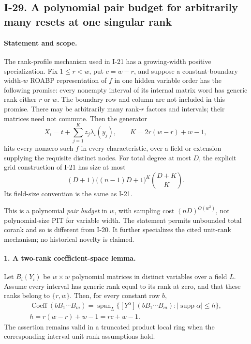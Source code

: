 \subsection{I-29. A polynomial pair budget for arbitrarily many resets at one singular rank}
\label{I-29}

\paragraph{Statement and scope.}
The rank-profile mechanism used in I-21 has a growing-width
positive specialization.  Fix $1\le r<w$, put $c=w-r$, and
suppose a constant-boundary width-$w$ ROABP representation
of $f$ in one hidden variable order has the following promise:
every nonempty interval of its internal matrix word has generic
rank either $r$ or $w$.  The boundary row and column are not
included in this promise.  There may be arbitrarily many
rank-$r$ factors and intervals; their matrices need not commute.
Then the generator
\[
 X_i=t+\sum_{j=1}^{K}z_j\lambda_i(y_j),
 \qquad K=2r(w-r)+w-1,
 \tag{I.42}
\]
hits every nonzero such $f$ in every characteristic, over a
field or extension supplying the requisite distinct nodes.
For total degree at most $D$, the explicit grid construction
of I-21 has size at most
\[
 (D+1)\bigl((n-1)D+1\bigr)^K\binom{D+K}{K}.
 \tag{I.43}
\]
Its field-size convention is the same as I-21.

This is a polynomial \emph{pair budget} in $w$, with
sampling cost $(nD)^{O(w^2)}$, not polynomial-size PIT for
variable width.  The statement permits unbounded total
corank and so is different from I-20.  It further specializes
the cited unit-rank mechanism; no historical novelty is claimed.

\paragraph{1. A two-rank coefficient-space lemma.}
Let $B_i(Y_i)$ be $w\times w$ polynomial matrices in distinct
variables over a field $L$.  Assume every interval has generic
rank equal to its rank at zero, and that these ranks belong
to $\{r,w\}$.  Then, for every constant row $b$,
\[
 \begin{gathered}
 \operatorname{Coeff}(bB_1\cdots B_m)
 =\operatorname{span}_L\{
       [Y^\alpha](bB_1\cdots B_m):
       |\operatorname{supp}\alpha|\le h\},\\
 h=r(w-r)+w-1=rc+w-1.
 \end{gathered}
 \tag{I.44}
\]
The assertion remains valid in a truncated product local ring
when the corresponding interval unit-rank assumptions hold.

